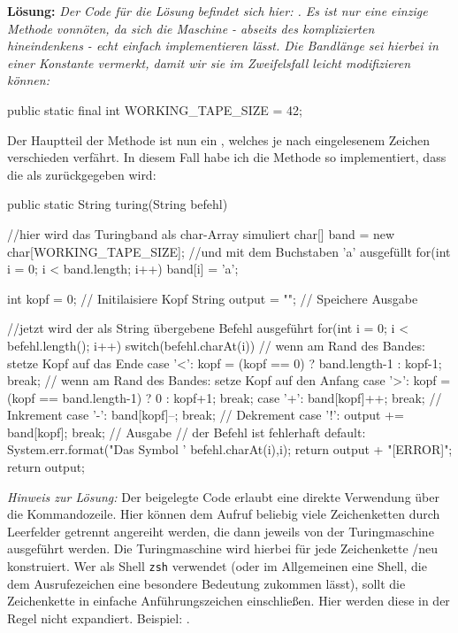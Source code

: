 \documentclass[table]{sopra-base}
\makeatletter
\let\T\texttt
\def\pc{\noexpand\rotatebox[origin=c]{270}{\noexpand\faPaperclip{}}}
\def\aTask#1#2{\attachDocumentText{#1/#2}{\pc{} \noexpand\detokenize{#2}}}
\newenvironment{solution}{\null\par\noindent\textbf{\textcolor{sob@col@uulm@cs}{Lösung:}}\newline\bgroup\color{black}\slshape\ignorespaces}{\egroup}
\makeatother
\begin{document}
\begin{solution}
    Der Code für die Lösung befindet sich hier: \aTask{middle}{A31_Turing.java}. Es ist nur eine einzige Methode vonnöten, da sich die Maschine - abseits des komplizierten hineindenkens - echt einfach implementieren lässt. Die Bandlänge sei hierbei in einer Konstante vermerkt, damit wir sie im Zweifelsfall leicht modifizieren können:
\begin{java*}[morekeywords={[4]{WORKING_TAPE_SIZE}}]
public static final int WORKING_TAPE_SIZE = 42;
\end{java*}
     Der Hauptteil der Methode  ist nun ein , welches je nach eingelesenem Zeichen verschieden verfährt. In diesem Fall habe ich die Methode so implementiert, dass die  als  zurückgegeben wird:
\begin{java}[firstnumber=35,morekeywords={[4]{WORKING_TAPE_SIZE}}]
public static String turing(String befehl) {
    //hier wird das Turingband als char-Array simuliert
    char[] band = new char[WORKING_TAPE_SIZE];
    //und mit dem Buchstaben 'a' ausgefüllt
    for(int i = 0; i < band.length; i++)
        band[i] = 'a';

    int kopf = 0; // Initilaisiere Kopf
    String output = ""; // Speichere Ausgabe

    //jetzt wird der als String übergebene Befehl ausgeführt
    for(int i = 0; i < befehl.length(); i++){
        switch(befehl.charAt(i)){
            // wenn am Rand des Bandes: stetze Kopf auf das Ende
            case '<': kopf = (kopf == 0) ? band.length-1 : kopf-1; break;
            // wenn am Rand des Bandes: setze Kopf auf den Anfang
            case '>': kopf = (kopf == band.length-1) ? 0 : kopf+1; break;
            case '+': band[kopf]++; break; // Inkrement
            case '-': band[kopf]--; break; // Dekrement
            case '!': output += band[kopf]; break; // Ausgabe
            // der Befehl ist fehlerhaft
            default:
                System.err.format("Das Symbol '%
                    befehl.charAt(i),i);
                return output + "[ERROR]";
        }
    }
    return output;
}
\end{java}
\textit{Hinweis zur Lösung:} Der beigelegte Code erlaubt eine direkte Verwendung über die Kommandozeile. Hier können dem Aufruf  beliebig viele Zeichenketten durch Leerfelder getrennt angereiht werden, die dann jeweils von der Turingmaschine ausgeführt werden. Die Turingmaschine wird hierbei für jede Zeichenkette /neu konstruiert. Wer als Shell \T{zsh} verwendet (oder im Allgemeinen eine Shell, die dem Ausrufezeichen eine besondere Bedeutung zukommen lässt), sollt die Zeichenkette in einfache Anführungszeichen einschließen. Hier werden diese in der Regel nicht expandiert. Beispiel: .
\end{solution}
\end{document}
